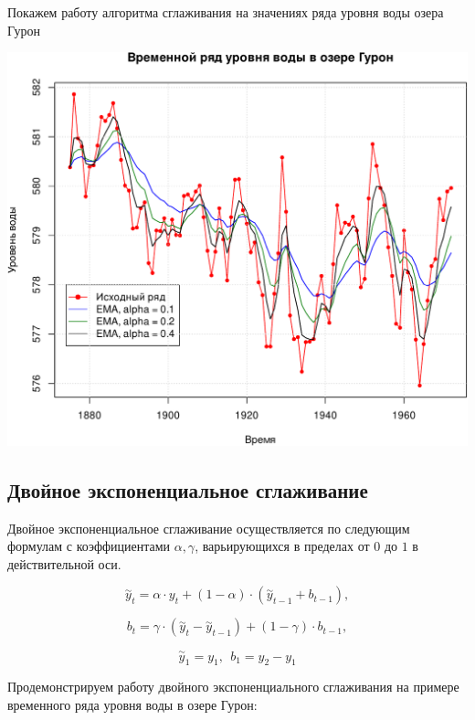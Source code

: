 \documentclass[
]{article}
\begin{document}
Покажем работу алгоритма сглаживания на значениях ряда уровня воды озера
Гурон

\begin{center}\includegraphics[width=0.6\linewidth]{Prac6_files/figure-latex/unnamed-chunk-12-1} \end{center}

\hypertarget{ux434ux432ux43eux439ux43dux43eux435-ux44dux43aux441ux43fux43eux43dux435ux43dux446ux438ux430ux43bux44cux43dux43eux435-ux441ux433ux43bux430ux436ux438ux432ux430ux43dux438ux435}{%
\subsection{\texorpdfstring{\textbf{Двойное экспоненциальное
сглаживание}}{Двойное экспоненциальное сглаживание}}\label{ux434ux432ux43eux439ux43dux43eux435-ux44dux43aux441ux43fux43eux43dux435ux43dux446ux438ux430ux43bux44cux43dux43eux435-ux441ux433ux43bux430ux436ux438ux432ux430ux43dux438ux435}}

Двойное экспоненциальное сглаживание осуществляется по следующим
формулам с коэффициентами \(\alpha,\gamma\), варьирующихся в пределах от
\(0\) до \(1\) в действительной оси.

\[
\overset{\sim}{y}_t = \alpha \cdot y_t + (1-\alpha) \cdot (\overset{\sim}{y}_{t-1}+b_{t-1}),
\]

\[
b_t = \gamma \cdot (\overset{\sim}{y}_t - \overset{\sim}{y}_{t-1}) + (1-\gamma) \cdot b_{t-1},
\]

\[
\overset{\sim}{y}_1=y_1,\ \  b_1=y_2-y_1
\]

Продемонстрируем работу двойного экспоненциального сглаживания на
примере временного ряда уровня воды в озере Гурон:
\end{document}
